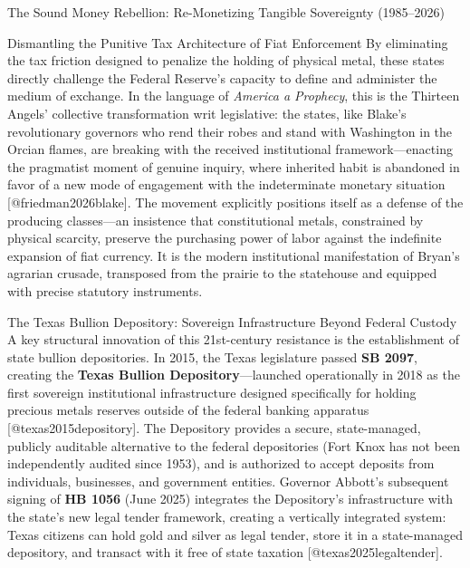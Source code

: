 \documentclass[
  ignorenonframetext,
]{beamer}
\begin{document}
\begin{frame}{The Sound Money Rebellion: Re-Monetizing Tangible
Sovereignty (1985--2026)}
\begin{block}{Dismantling the Punitive Tax Architecture of Fiat
Enforcement}
By eliminating the tax friction designed to penalize the holding of
physical metal, these states directly challenge the Federal Reserve's
capacity to define and administer the medium of exchange. In the
language of \emph{America a Prophecy}, this is the Thirteen Angels'
collective transformation writ legislative: the states, like Blake's
revolutionary governors who rend their robes and stand with Washington
in the Orcian flames, are breaking with the received institutional
framework---enacting the pragmatist moment of genuine inquiry, where
inherited habit is abandoned in favor of a new mode of engagement with
the indeterminate monetary situation {[}@friedman2026blake{]}. The
movement explicitly positions itself as a defense of the producing
classes---an insistence that constitutional metals, constrained by
physical scarcity, preserve the purchasing power of labor against the
indefinite expansion of fiat currency. It is the modern institutional
manifestation of Bryan's agrarian crusade, transposed from the prairie
to the statehouse and equipped with precise statutory instruments.
\end{block}

\begin{block}{The Texas Bullion Depository: Sovereign Infrastructure
Beyond Federal Custody}
\protect{}\label{the-texas-bullion-depository-sovereign-infrastructure-beyond-federal-custody}
A key structural innovation of this 21st-century resistance is the
establishment of state bullion depositories. In 2015, the Texas
legislature passed \textbf{SB 2097}, creating the \textbf{Texas Bullion
Depository}---launched operationally in 2018 as the first sovereign
institutional infrastructure designed specifically for holding precious
metals reserves outside of the federal banking apparatus
{[}@texas2015depository{]}. The Depository provides a secure,
state-managed, publicly auditable alternative to the federal
depositories (Fort Knox has not been independently audited since 1953),
and is authorized to accept deposits from individuals, businesses, and
government entities. Governor Abbott's subsequent signing of \textbf{HB
1056} (June 2025) integrates the Depository's infrastructure with the
state's new legal tender framework, creating a vertically integrated
system: Texas citizens can hold gold and silver as legal tender, store
it in a state-managed depository, and transact with it free of state
taxation {[}@texas2025legaltender{]}.


\end{block}
\end{frame}
\end{document}
